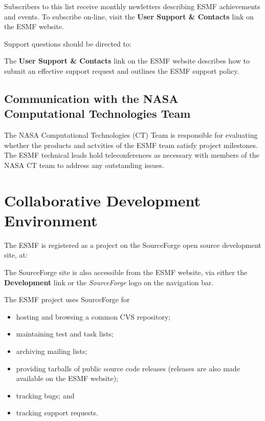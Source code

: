 Subscribers to this list receive monthly newletters describing ESMF 
achievements and events.  To subscribe on-line, visit the {\bf User 
Support \& Contacts} link on the ESMF website.

Support questions should be directed to:
\begin{center}
\end{center}

The {\bf User Support \& Contacts} link on the ESMF website describes
how to submit an effective support request and outlines the ESMF support
policy.

\subsection{Communication with the NASA Computational Technologies Team}
The NASA Computational Technologies (CT) Team is responsible for
evaluating whether the products and actvities of the ESMF team satisfy
project milestones.  The ESMF technical leads hold teleconferences as
necessary with members of the NASA CT team to address any outstanding issues.

\section{Collaborative Development Environment}

The ESMF is registered as a project on the SourceForge 
open source development site, at:
\begin{center}
\end{center}

The SourceForge site is also accessible from the ESMF website,
via either the {\bf Development} link or the {\it SourceForge}
logo on the navigation bar.

The ESMF project uses SourceForge for
\begin{itemize}
\item hosting and browsing a common CVS repository; 
\item maintaining test and task lists;
\item archiving mailing lists;
\item providing tarballs of public source code releases (releases
      are also made available on the ESMF website);
\item tracking bugs; and 
\item tracking support requests.
\end{itemize}








